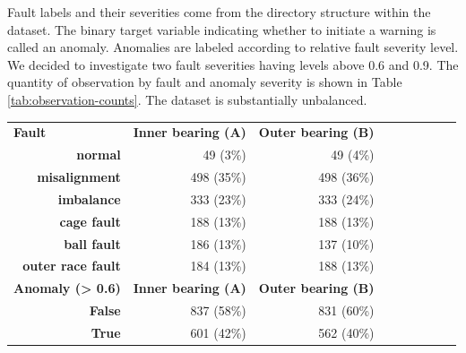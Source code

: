 Fault labels and their severities come from the directory structure within the dataset. The binary target variable indicating whether to initiate a warning is called an anomaly. Anomalies are labeled according to relative fault severity level. We decided to investigate two fault severities having levels above 0.6 and 0.9. The quantity of observation by fault and anomaly severity is shown in Table \ref{tab:observation-counts}. The dataset is substantially unbalanced.

\begin{table}[ht]
\centering
\renewcommand{\arraystretch}{1.2}
\begin{tabular}{rrrrrllll}
\cline{1-3}
\multicolumn{1}{|l|}{\textbf{Fault}}                                                                                          & \multicolumn{1}{l|}{\textbf{Inner bearing (A)}} & \multicolumn{1}{l|}{\textbf{Outer bearing (B)}} \\ \cline{1-3}
\multicolumn{1}{|r|}{\textbf{normal}}                 & \multicolumn{1}{r|}{49 (3\%)}                   & \multicolumn{1}{r|}{49 (4\%)}                    \\ \cline{1-3}
\multicolumn{1}{|r|}{\textbf{misalignment}}           & \multicolumn{1}{r|}{498 (35\%)}                 & \multicolumn{1}{r|}{498 (36\%)}                  \\ \cline{1-3}
\multicolumn{1}{|r|}{\textbf{imbalance}}              & \multicolumn{1}{r|}{333 (23\%)}                 & \multicolumn{1}{r|}{333 (24\%)}                  \\ \cline{1-3}
\multicolumn{1}{|r|}{\textbf{cage fault}}             & \multicolumn{1}{r|}{188 (13\%)}                 & \multicolumn{1}{r|}{188 (13\%)}                  \\ \cline{1-3}
\multicolumn{1}{|r|}{\textbf{ball fault}}             & \multicolumn{1}{r|}{186 (13\%)}                 & \multicolumn{1}{r|}{137 (10\%)}                  \\ \cline{1-3}
\multicolumn{1}{|r|}{\textbf{outer race fault}}       & \multicolumn{1}{r|}{184 (13\%)}                 & \multicolumn{1}{r|}{188 (13\%)}                  \\ \cline{1-3}

\multicolumn{1}{|l|}{\textbf{Anomaly (> 0.6)}}                                                                                          & \multicolumn{1}{l|}{\textbf{Inner bearing (A)}} & \multicolumn{1}{l|}{\textbf{Outer bearing (B)}} \\ \cline{1-3}
\multicolumn{1}{|r|}{\textbf{False}}                                                                            & \multicolumn{1}{r|}{837 (58\%)}                 & \multicolumn{1}{r|}{831 (60\%)}          \\ \cline{1-3}
\multicolumn{1}{|r|}{\textbf{True}}                                                                             & \multicolumn{1}{r|}{601 (42\%)}                 & \multicolumn{1}{r|}{562 (40\%)}          \\ \cline{1-3}


\end{tabular}
\end{table}
